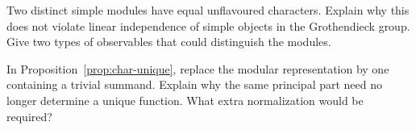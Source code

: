 \begin{exercise}\label{ex:char-equal}
Two distinct simple modules have equal unflavoured characters.
Explain why this does not violate linear independence of simple
objects in the Grothendieck group. Give two types of observables
that could distinguish the modules.

\par\smallskip{}\par
\end{exercise}

\begin{exercise}\label{ex:char-uniqueness-scope}
In Proposition~\ref{prop:char-unique}, replace the modular
representation by one containing a trivial summand. Explain why
the same principal part need no longer determine a unique function.
What extra normalization would be required?

\par\smallskip{}\par
\end{exercise}
